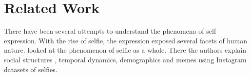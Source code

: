 \section{ Related Work }
There have been several attempts to understand the phenomena of self expression. With the rise of selfie, the expression exposed several facets of human nature. \cite{Souza2015} looked at the phenomenon of selfie as a whole. There the authors explain social structures , temporal dynamics, demographics and memes using Instagram datasets of selfies. 